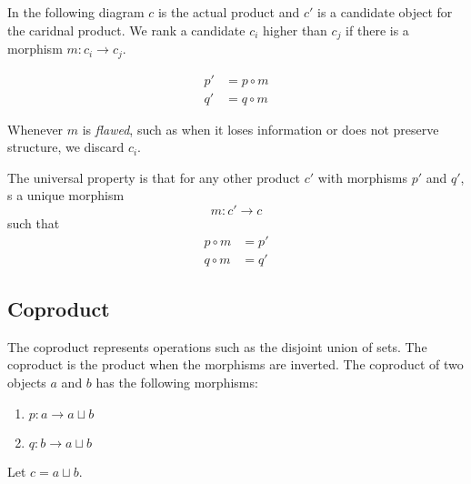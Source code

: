 \documentclass[a4paper]{article}
\begin{document}
In the following diagram \(c\) is the actual product and \(c'\) is a candidate object
for the caridnal product.
We rank a candidate \(c_i\) higher than \(c_j\) if there is a morphism
\(m:c_i \to c_j\).

\begin{minipage}{0.5\textwidth}
\end{minipage}
\begin{minipage}{0.5\textwidth}
    \begin{align*}
        p' &= p \circ m \\
        q' &= q \circ m 
    \end{align*}
\end{minipage}

Whenever \(m\) is \textit{flawed}, such as when it loses information
or does not preserve structure, we discard \(c_i\).

The universal property is that for any other product
\(c'\) with morphisms \(p'\) and \(q'\),
s a unique morphism
\[
    m:c'\to c
\]
such that
\begin{align*}
    p \circ m &= p' \\
    q \circ m &= q'
\end{align*}

\pagebreak

\subsection{Coproduct}

The coproduct represents operations
such as the disjoint union of sets.
The coproduct is the product when the morphisms are inverted.
The coproduct of two objects \(a\) and \(b\) has the following
morphisms:
\begin{enumerate}
    \item \(p:a \to a\sqcup b\)
    \item \(q:b \to a\sqcup b\)
\end{enumerate}

Let \(c=a\sqcup b\).
\end{document}
